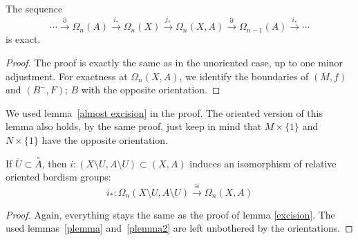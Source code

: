 \documentclass[a4paper,12pt]{article}
\begin{document}
\begin{lemma}
    The sequence
    \[\cdots\xrightarrow{\partial}\Omega_n(A)\xrightarrow{i_\ast}\Omega_n(X)\xrightarrow{j_\ast}\Omega_n(X,A)\xrightarrow{\partial}\Omega_{n-1}(A)\xrightarrow{i_\ast}\cdots\]
    is exact.
\end{lemma}

\begin{proof}\cite{conner}
    The proof is exactly the same as in the unoriented case, up to one minor adjustment. For exactness at \(\Omega_n(X,A)\), we identify the boundaries of \((M,f)\) and \((B^-,F)\); \(B\) with the opposite orientation.
\begin{comment}
    \begin{itemize}
        \item \textbf{Exactness at \(\Omega_n(A)\)}: \(i_\ast\circ\partial=0\), as \((M,f)\) is a nullbordism for \(i_\ast\circ\partial(M,f)=\partial(M,f)\)\\
        For a nullbordism \((B,g)\) of \(M,f\), \(\partial(B,g)=(M,f)\).
        \item \textbf{Exactness at \(\Omega_n(X)\)}: 
        \(j_\ast\circ i_\ast=0\) exactly as in the unoriented case.

        \item \textbf{Exactness at \(\Omega_n(X,A)\)}: 
    \end{itemize}
\end{comment}
\end{proof}

\begin{remark}
    We used lemma\ \ref{almost excision} in the proof. The oriented version of this lemma also holds, by the same proof, just keep in mind that \(M\times\{1\}\) and \(N\times\{1\}\) have the opposite orientation.
\end{remark}

\begin{lemma}
    If \(\overline{U}\subset\overset{\circ}{A}\), then \(i:(X\setminus U, A\setminus U)\subset (X,A)\) induces an isomorphism of relative oriented bordism groups:
    \[i_\ast:\Omega_n(X\setminus U,A\setminus U)\xrightarrow{\cong}\Omega_n(X,A)\]
\end{lemma}

\begin{proof}\cite{conner}
    Again, everything stays the same as the proof of lemma \ref{excision}. The used lemmas\ \ref{plemma} and\ \ref{plemma2} are left unbothered by the orientations.
\end{proof}
\end{document}

